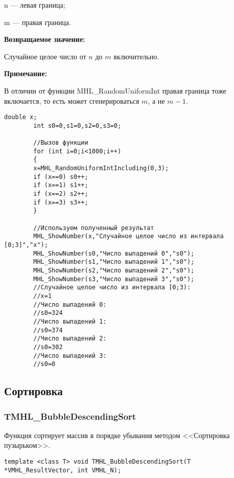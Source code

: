 \documentclass[a4paper,12pt]{article}
\begin{document}
n --- левая граница;

 m --- правая граница.

\textbf{Возвращаемое значение:}

Случайное целое число от $n$ до $m$ включительно.

\textbf{Примечание:}

 В отличии от функции MHL\_RandomUniformInt правая граница тоже включается, то есть может сгенерироваться $m$, а не $m-1$.


\begin{lstlisting}[label=code_use_MHL_RandomUniformIntIncluding,caption=Пример использования]
        double x;
        int s0=0,s1=0,s2=0,s3=0;

        //Вызов функции
        for (int i=0;i<1000;i++)
        {
        x=MHL_RandomUniformIntIncluding(0,3);
        if (x==0) s0++;
        if (x==1) s1++;
        if (x==2) s2++;
        if (x==3) s3++;
        }

        //Используем полученный результат
        MHL_ShowNumber(x,"Случайное целое число из интервала [0;3]","x");
        MHL_ShowNumber(s0,"Число выпадений 0","s0");
        MHL_ShowNumber(s1,"Число выпадений 1","s0");
        MHL_ShowNumber(s2,"Число выпадений 2","s0");
        MHL_ShowNumber(s3,"Число выпадений 3","s0");
        //Случайное целое число из интервала [0;3):
        //x=1
        //Число выпадений 0:
        //s0=324
        //Число выпадений 1:
        //s0=374
        //Число выпадений 2:
        //s0=302
        //Число выпадений 3:
        //s0=0
\end{lstlisting}

\subsection{Сортировка}

\subsubsection{TMHL\_BubbleDescendingSort}\label{TMHL_BubbleDescendingSort}

Функция сортирует массив в порядке убывания методом <<Сортировка пузырьком>>.


\begin{lstlisting}[label=code_syntax_TMHL_BubbleDescendingSort,caption=Синтаксис]
template <class T> void TMHL_BubbleDescendingSort(T *VMHL_ResultVector, int VMHL_N);
\end{lstlisting}
\end{document}
